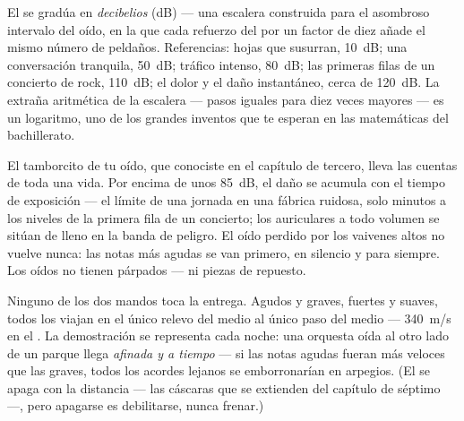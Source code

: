 \begin{example}\label{ex:g8:sound-pitch-loudness:decibels}
El  se gradúa en \emph{decibelios} (\unit{dB})
--- una escalera construida para el asombroso intervalo del oído, en la
que cada refuerzo del  por un factor de diez añade el mismo
número de peldaños. Referencias: hojas que susurran, \qty{10}{dB}; una
conversación tranquila, \qty{50}{dB}; tráfico intenso, \qty{80}{dB};
las primeras filas de un concierto de rock, \qty{110}{dB}; el dolor y
el daño instantáneo, cerca de \qty{120}{dB}. La extraña aritmética de
la escalera --- pasos iguales para  diez veces mayores --- es un
logaritmo, uno de los grandes inventos que te esperan en las
matemáticas del bachillerato.
\end{example}

\begin{remark}\label{rem:g8:sound-pitch-loudness:earsafety}
El tamborcito de tu oído, que conociste en el capítulo de tercero,
lleva las cuentas de toda una vida. Por encima de unos \qty{85}{dB}, el
daño se acumula con el tiempo de exposición --- el límite de una jornada
en una fábrica ruidosa, solo minutos a los niveles de la primera fila
de un concierto; los auriculares a todo volumen se sitúan de lleno en
la banda de peligro. El oído perdido por los vaivenes altos no
vuelve nunca: las notas más agudas se van primero, en silencio y para
siempre. Los oídos no tienen párpados --- ni piezas de repuesto.
\end{remark}

\begin{example}\label{ex:g8:sound-pitch-loudness:speed}
Ninguno de los dos mandos toca la entrega. Agudos y graves, fuertes y
suaves, todos los  viajan en el único relevo del
medio al único paso del medio --- \qty{340}{m/s} en el
. La demostración se representa cada noche: una orquesta oída
al otro lado de un parque llega \emph{afinada y a tiempo} --- si las
notas agudas fueran más veloces que las graves, todos los acordes
lejanos se emborronarían en arpegios. (El  se apaga con la
distancia --- las cáscaras que se extienden del capítulo de séptimo ---,
pero apagarse es debilitarse, nunca frenar.)
\end{example}

